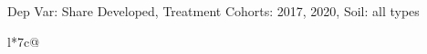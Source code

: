 \begin{table}[H]
\captionlistentry[table]{}
\label{table:beaver_land_class_DVis_land_class_3_SCg23_SSall_soil}
\scriptsize %
Dep Var: Share Developed, Treatment Cohorts: 2017, 2020, Soil: all types \\
\begin{threeparttable}
\begin{tabulary}{\textwidth}{l*{7}{c}@{}}
\toprule \toprule
\noalign{\smallskip}
\noalign{\smallskip}
\midrule \bottomrule
\end{tabulary}
\medskip
\end{threeparttable}
\end{table}
